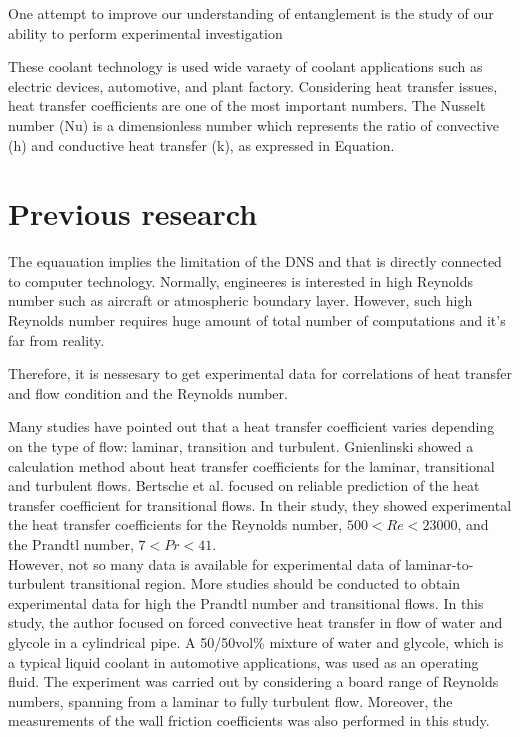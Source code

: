\documentclass[12pt,oneside]{jbook}
\begin{document}
One attempt to improve our understanding of entanglement is the study of our ability to perform experimental investigation


These coolant technology is used wide varaety of coolant applications such as electric devices, automotive, and plant factory.
Considering heat transfer issues, heat transfer coefficients are one of the most important numbers.
The Nusselt number (Nu) is a dimensionless number which represents the ratio of convective (h) and conductive heat transfer (k), as expressed in Equation.
\section{Previous research}

The equauation implies the limitation of the DNS and that is directly connected to computer technology.
Normally, engineeres is interested in high Reynolds number such as aircraft or atmospheric boundary layer.
However, such high Reynolds number requires huge amount of total number of computations and it's far from reality.

Therefore, it is nessesary to get experimental data for correlations of heat transfer and flow condition and the Reynolds number.

Many studies have pointed out that a heat transfer coefficient varies depending on the type of flow: laminar, transition and turbulent.
Gnienlinski\cite{Gnielinski1975} showed a calculation method about heat transfer coefficients for the laminar, transitional and turbulent flows.
Bertsche et al.\cite{Bertsche2016} focused on reliable prediction of the heat transfer coefficient for transitional flows.
In their study, they showed experimental the heat transfer coefficients for the Reynolds number, $500 < Re < 23000$, and the Prandtl number, $7 < Pr < 41$.\\
However, not so many data is available for experimental data of laminar-to-turbulent transitional region.
More studies should be conducted to obtain experimental data for high the Prandtl number and transitional flows.
In this study, the author focused on forced convective heat transfer in flow of water and glycole in a cylindrical pipe.
A 50/50vol\% mixture of water and glycole, which is a typical liquid coolant in automotive applications, was used as an operating fluid.
The experiment was carried out by considering a board range of Reynolds numbers, spanning from a laminar to fully turbulent flow.
Moreover, the measurements of the wall friction coefficients was also performed in this study.
\end{document}
